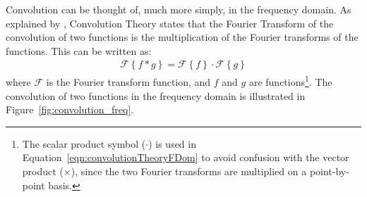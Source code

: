 Convolution can be thought of, much more simply, in the frequency domain. As explained by \citet[chap. 2]{Bracewell2000}, Convolution Theory states that the Fourier Transform of the convolution of two functions is the multiplication of the Fourier transforms of the functions. This can be written as:
\begin{align}
\mathcal{F}\left\{f \ast g\right\} = \mathcal{F}\left\{f\right\} \cdot \mathcal{F}\left\{g\right\} \label{eqn:convolutionTheoryFDom}
\end{align}
where $\mathrm{\mathcal{F}}$ is the Fourier transform function, and $f$ and $g$ are functions\footnote{The scalar product symbol ($\cdot$) is used in Equation~\ref{eqn:convolutionTheoryFDom} to avoid confusion with the vector product ($\times$), since the two Fourier transforms are multiplied on a point-by-point basis.}. The convolution of two functions in the frequency domain is illustrated in Figure~\ref{fig:convolution_freq}.
